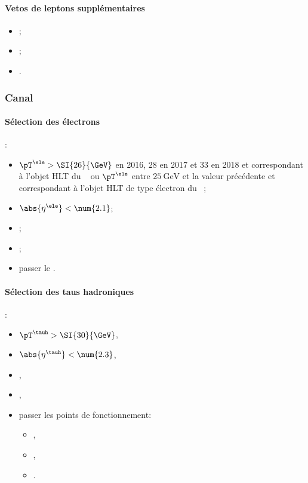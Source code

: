 \paragraph{Vetos de leptons supplémentaires}
\LeptonVetoes
\begin{itemize}
    \item \LeptonVetoesSecondMuon;
    \item \LeptonVetoesExtraEle;
    \item \LeptonVetoesMuonPair.
\end{itemize}

\subsubsection{Canal \ele\tauh}\label{chapter-HTT_analysis-section-offline-et}
\paragraph{Sélection des électrons}
:
\begin{itemize}
    \item $\pT^{\ele} > \SI{26}{\GeV}$ en 2016, \num{28} en 2017 et \num{33} en 2018 et correspondant à l'objet HLT du \HLTpath\ \HLTSingleEle{} ou $\pT^{\ele}$ entre $\SI{25}{\GeV}$ et la valeur précédente et correspondant à l'objet HLT de type électron du \HLTpath\ \HLTEleTauCross{};
    \item $\abs{\eta^{\ele}} < \num{2.1}$;
    \item \Leptondzdxy;
    \item {};
    \item passer le \NinetyNineEleMVA.
\end{itemize}
\paragraph{Sélection des taus hadroniques}
:
\begin{itemize}
    \item $\pT^{\tauh} > \SI{30}{\GeV}$,
    \item $\abs{\eta^{\tauh}} < \num{2.3}$,
    \item \TauHdz,
    \item \NewDecayModeFinding,
    \item passer les points de fonctionnement:
        \begin{itemize}
            \item {},
            \item {},
            \item {}.
        \end{itemize}
\end{itemize}
